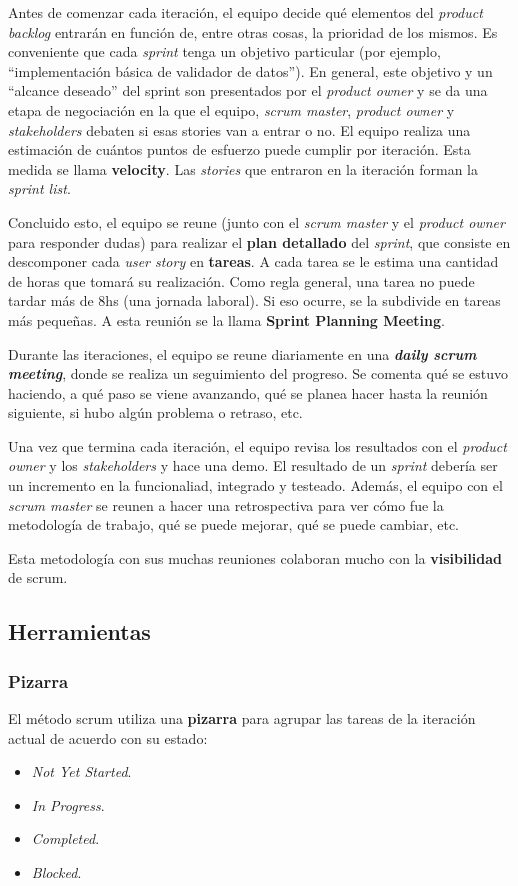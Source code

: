 \documentclass[]{article}
\begin{document}
Antes de comenzar cada iteración, el equipo decide qué elementos del \emph{product backlog} entrarán en función de, entre otras cosas, la prioridad de los mismos. Es conveniente que cada \emph{sprint} tenga un objetivo particular (por ejemplo, ``implementación básica de validador de datos''). En general, este objetivo y un ``alcance deseado'' del sprint son presentados por el \emph{product owner} y se da una etapa de negociación en la que el equipo, \emph{scrum master}, \emph{product owner} y \emph{stakeholders} debaten si esas stories van a entrar o no. El equipo realiza una estimación de cuántos puntos de esfuerzo puede cumplir por iteración. Esta medida se llama \textbf{velocity}. Las \emph{stories} que entraron en la iteración forman la \emph{sprint list}.

Concluido esto, el equipo se reune (junto con el \emph{scrum master} y el \emph{product owner} para responder dudas) para realizar el \textbf{plan detallado} del \emph{sprint}, que consiste en descomponer cada \emph{user story} en \textbf{tareas}. A cada tarea se le estima una cantidad de horas que tomará su realización. Como regla general, una tarea no puede tardar más de 8hs (una jornada laboral). Si eso ocurre, se la subdivide en tareas más pequeñas. A esta reunión se la llama \textbf{Sprint Planning Meeting}.

Durante las iteraciones, el equipo se reune diariamente en una \textbf{\emph{daily scrum meeting}}, donde se realiza un seguimiento del progreso. Se comenta qué se estuvo haciendo, a qué paso se viene avanzando, qué se planea hacer hasta la reunión siguiente, si hubo algún problema o retraso, etc.

Una vez que termina cada iteración, el equipo revisa los resultados con el \emph{product owner} y los \emph{stakeholders} y hace una demo. El resultado de un \emph{sprint} debería ser un incremento en la funcionaliad, integrado y testeado. Además, el equipo con el \emph{scrum master} se reunen a hacer una retrospectiva para ver cómo fue la metodología de trabajo, qué se puede mejorar, qué se puede cambiar, etc.

Esta metodología con sus muchas reuniones colaboran mucho con la \textbf{visibilidad} de scrum.

\subsection{Herramientas}
\subsubsection{Pizarra}
El método scrum utiliza una \textbf{pizarra} para agrupar las tareas de la iteración actual de acuerdo con su estado:
\begin{itemize}
	\item \emph{Not Yet Started}.
	\item \emph{In Progress}.
	\item \emph{Completed}.
	\item \emph{Blocked}.
\end{itemize}
\end{document}
